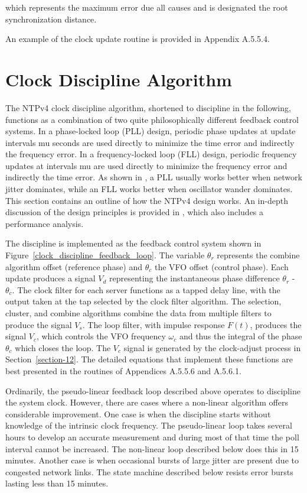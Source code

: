 which represents the maximum error due all causes and is designated
the root synchronization distance.

An example of the clock update routine is provided in
Appendix A.5.5.4.

\section{Clock Discipline Algorithm}
\label{section-11-3}

The NTPv4 clock discipline algorithm, shortened to discipline in the
following, functions as a combination of two quite philosophically
different feedback control systems. In a phase-locked loop (PLL)
design, periodic phase updates at update intervals mu seconds are
used directly to minimize the time error and indirectly the frequency
error. In a frequency-locked loop (FLL) design, periodic frequency
updates at intervals mu are used directly to minimize the frequency
error and indirectly the time error. As shown in \cite{ref7}, a PLL
usually works better when network jitter dominates, while an FLL
works better when oscillator wander dominates. This section contains
an outline of how the NTPv4 design works. An in-depth discussion of
the design principles is provided in \cite{ref7}, which also includes a
performance analysis.

The discipline is implemented as the feedback control system shown in
Figure~\ref{clock_discipline_feedback_loop}. The variable $ \theta_r $ represents the combine algorithm
offset (reference phase) and $ \theta_c $ the VFO offset (control phase).
Each update produces a signal $ V_d $ representing the instantaneous
phase difference $ \theta_r $ - $ \theta_c $. The clock filter for each server
functions as a tapped delay line, with the output taken at the tap
selected by the clock filter algorithm. The selection, cluster, and
combine algorithms combine the data from multiple filters to produce
the signal $ V_s $. The loop filter, with impulse response $ F(t) $,
produces the signal $ V_c $, which controls the VFO frequency $ \omega_c $ and
thus the integral of the phase $ \theta_c $ which closes the loop. The
$ V_c $ signal is generated by the clock-adjust process in Section~\ref{section-12}.
The detailed equations that implement these functions are best
presented in the routines of Appendices A.5.5.6 and A.5.6.1.


Ordinarily, the pseudo-linear feedback loop described above operates
to discipline the system clock. However, there are cases where a
non-linear algorithm offers considerable improvement. One case is
when the discipline starts without knowledge of the intrinsic clock
frequency. The pseudo-linear loop takes several hours to develop an
accurate measurement and during most of that time the poll interval
cannot be increased. The non-linear loop described below does this
in 15 minutes. Another case is when occasional bursts of large
jitter are present due to congested network links. The state machine
described below resists error bursts lasting less than 15 minutes.

